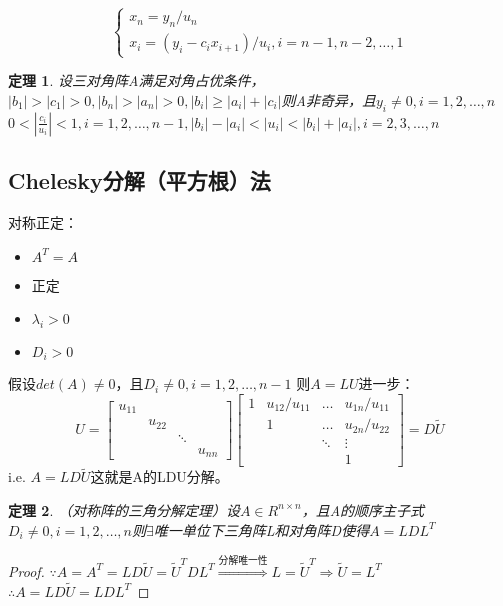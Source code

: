 \documentclass[a4paper]{article}
\newtheorem{theorem}{定理}[section]
\begin{document}
\begin{equation}
  \left\{
    \begin{array}{lr}
      x_n = y_n/u_n \\
      x_i = (y_i-c_ix_{i+1})/u_i, i=n-1,n-2,\dots, 1
    \end{array}
    \right.
    \label{eq:4.10}
\end{equation}

\begin{theorem}
  设三对角阵A满足对角占优条件，$|b_1|>|c_1|>0, |b_n|>|a_n|>0, |b_i|\ge |a_i|+|c_i|$则A非奇异，且$y_i\neq 0, i=1,2,\dots, n$
  $0<|\frac{c_i}{u_i}|<1, i=1,2,\dots, n-1, |b_i|-|a_i|<|u_i|<|b_i|+|a_i|, i=2,3,\dots, n$
\end{theorem}

\subsection{Chelesky分解（平方根）法}
对称正定：
\begin{itemize}
\item $A^T = A$
\item 正定
\item $\lambda_i > 0$
\item $D_i > 0$
\end{itemize}

假设$det(A)\neq 0$，且$D_i\neq 0, i=1,2,\dots, n-1$
则$A=LU$进一步：
$$U=\left[
  \begin{matrix}
    u_{11} \\
    & u_{22} \\
    & & \ddots \\
    & & & u_{nn}
  \end{matrix}\right]
  \left[
    \begin{matrix}
      1 & u_{12}/u_{11} & \dots & u_{1n}/u_{11} \\
      & 1 & \dots & u_{2n}/u_{22} \\
      & & \ddots & \vdots \\
      & & & 1
    \end{matrix}
    \right]=D\widetilde{U}
  $$
i.e. $A=LD\widetilde{U}$这就是A的LDU分解。

\begin{theorem}
  （对称阵的三角分解定理）设$A\in R^{n\times n}$，且A的顺序主子式$D_i\neq 0, i=1,2,\dots,n$则$\exists$唯一单位下三角阵L和对角阵D使得$A=LDL^T$
\end{theorem}

\begin{proof}
$\because A=A^T=LD\widetilde{U} = \widetilde{U}^TDL^T \stackrel{\text{分解唯一性}}{\Rightarrow} L=\widetilde{U}^T\Rightarrow \widetilde{U}=L^T$ \\
$\therefore A=LD\widetilde{U}=LDL^T$
\end{proof}
\end{document}
